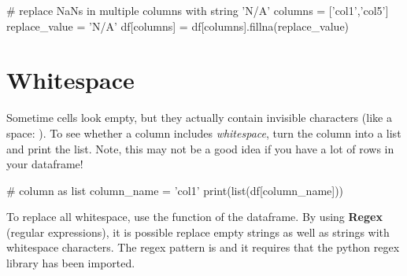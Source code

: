 \begin{pycode}
    # replace NaNs in multiple columns with string 'N/A'
    columns = ['col1','col5']
    replace_value = 'N/A'
    df[columns] = df[columns].fillna(replace_value)
\end{pycode}



\section{Whitespace}

Sometime cells look empty, but they actually contain invisible characters (like a space: ). To see whether a column includes \textit{whitespace}, turn the column into a list and print the list. Note, this may not be a good idea if you have a lot of rows in your dataframe!

\begin{pycode}
    # column as list
    column_name = 'col1'
    print(list(df[column_name]))
\end{pycode}

To replace all whitespace, use the  function of the dataframe. By using \textbf{Regex} (regular expressions), it is possible replace empty strings as well as strings with whitespace characters. The regex pattern is  and it requires that the python regex library has been imported.

